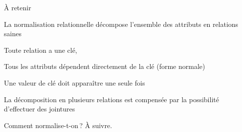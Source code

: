 
\begin{frame}{À retenir}

La normalisation relationnelle décompose l'ensemble des attributs
en relations saines

\vfill
\begin{redbullet}
  \item Toute relation a une clé,
 \item Tous les attributs dépendent \alert{directement} de la clé (forme normale)
 \item Une valeur de clé doit apparaître une seule fois
 \item La décomposition en plusieurs relations est compensée par la possibilité
      d'effectuer des jointures
 \end{redbullet}

\vfill

\alert{Comment normalise-t-on\,?} À suivre.
\end{frame}

